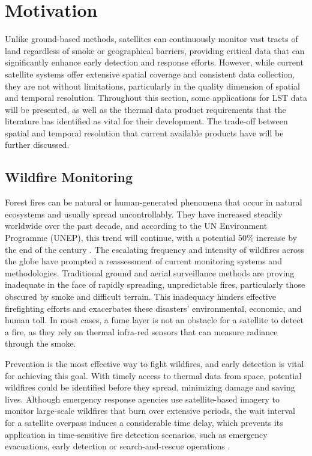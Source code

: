     
    \newpage
    

\section{Motivation}

Unlike ground-based methods, satellites can continuously monitor vast tracts of land regardless of smoke or geographical barriers, providing critical data that can significantly enhance early detection and response efforts. 
However, while current satellite systems offer extensive spatial coverage and consistent data collection, they are not without limitations, particularly in the quality dimension of spatial and temporal resolution. Throughout this section, some applications for LST data will be presented, as well as the thermal data product requirements that the literature has identified as vital for their development. The trade-off between spatial and temporal resolution that current available products have will be further discussed.
    

    \subsection{Wildfire Monitoring}

    Forest fires can be natural or human-generated phenomena that occur in natural ecosystems and usually spread uncontrollably.
    They have increased steadily worldwide over the past decade, and according to the UN Environment Programme (UNEP), this trend will continue, with a potential 50\% increase by the end of the century \cite{UNEP2021Wildfire}. 
    The escalating frequency and intensity of wildfires across the globe have prompted a reassessment of current monitoring systems and methodologies. Traditional ground and aerial surveillance methods are proving inadequate in the face of rapidly spreading, unpredictable fires, particularly those obscured by smoke and difficult terrain. This inadequacy hinders effective firefighting efforts and exacerbates these disasters' environmental, economic, and human toll. 
    In most cases, a fume layer is not an obstacle for a satellite to detect a fire, as they rely on thermal infra-red sensors that can measure radiance through the smoke.

    Prevention is the most effective way to fight wildfires, and early detection is vital for achieving this goal. 
    With timely access to thermal data from space, potential wildfires could be identified before they spread, minimizing damage and saving lives.
    Although emergency response agencies use satellite-based imagery to monitor large-scale wildfires that burn over extensive periods, the wait interval for a satellite overpass induces a considerable time delay, which prevents its application in time-sensitive fire detection scenarios, such as emergency evacuations, early detection or search-and-rescue operations \cite{lippitt2015time}. 

